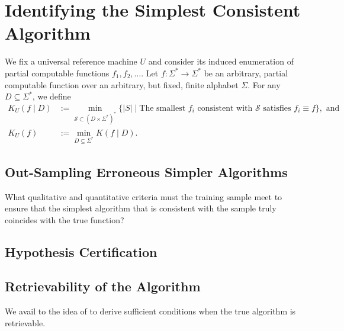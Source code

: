 
\chapter{Identifying the Simplest Consistent Algorithm}
We fix a universal reference machine $U$ and consider its induced enumeration of partial computable functions $f_1,f_2,\dots$.
Let $f:\Sigma^{*}\to\Sigma^{*}$ be an arbitrary, partial computable function over an arbitrary, but fixed, finite alphabet $\Sigma$.
For any $D\subseteq \Sigma^{*}$, we define
\begin{align}
	K_U(f\mid D)&:=\min_{\mathcal{S}\subset (D\times \Sigma^{*})^{*}}\{|S|\mid \text{The smallest } f_i \text{ consistent with } \mathcal{S} \text{ satisfies } f_i\equiv f\}, \text{ and}\\
	K_U(f)&:= \min_{D\subseteq \Sigma^{*}} K(f\mid D).
\end{align}
\section{Out-Sampling Erroneous Simpler Algorithms}
What qualitative and quantitative criteria must the training sample meet to ensure that the simplest algorithm that is consistent with the sample truly coincides with the true function?

\section{Hypothesis Certification}

\section{Retrievability of the Algorithm}
We avail to the idea of \cite{richens2024robust} to derive sufficient conditions when the true algorithm is retrievable.
